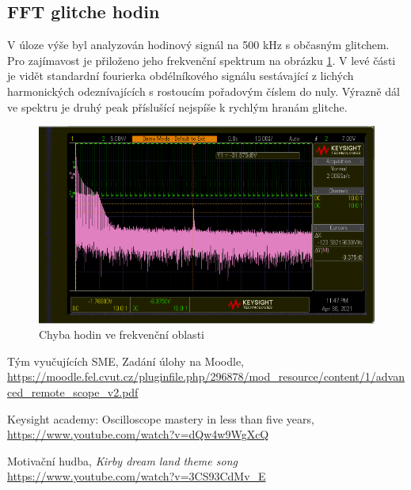 \documentclass[twoside]{article}
\begin{document}
\subsection{FFT glitche hodin}

V úloze výše byl analyzován hodinový signál na 500 kHz s občasným glitchem. Pro zajímavost je přiloženo jeho frekvenční spektrum na obrázku \ref{fig:fft_clock_glitch}.
V levé části je vidět standardní fourierka obdélníkového signálu sestávající z lichých harmonických odeznívajících s rostoucím pořadovým číslem do nuly.
Výrazně dál ve spektru je druhý peak příslušící nejspíše k rychlým hranám glitche.
\begin{figure}[htbp]
	\centering
	\includegraphics[width=0.8\linewidth]{clock_glitch_fft.png                    }
	\caption{Chyba hodin ve frekvenční oblasti }
	\label{fig:fft_clock_glitch}
\end{figure}

		\begin{thebibliography}{9}
			
			
			Tým vyučujících SME, Zadání úlohy na Moodle, \url{https://moodle.fel.cvut.cz/pluginfile.php/296878/mod_resource/content/1/advanced_remote_scope_v2.pdf}
			
			Keysight academy: Oscilloscope mastery in less than five years, \url{https://www.youtube.com/watch?v=dQw4w9WgXcQ}
			
			Motivační hudba, \emph{Kirby dream land theme song} \url{https://www.youtube.com/watch?v=3CS93CdMv_E}
			
		\end{thebibliography}
		
		
\end{document}
